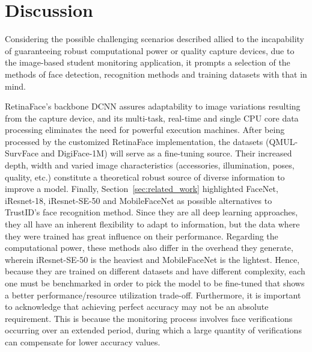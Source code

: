 \documentclass[class=report, crop=false, a4paper, 12pt]{standalone}
\begin{document}
\section{Discussion}\label{sec:methodology_discussion}
\par Considering the possible challenging scenarios described allied to the incapability of guaranteeing robust computational power or quality capture devices, due to the image-based student monitoring application, it prompts a selection of the methods of face detection, recognition methods and training datasets with that in mind. 
\par RetinaFace's backbone DCNN assures adaptability to image variations resulting from the capture device, and its multi-task, real-time and single CPU core data processing eliminates the need for powerful execution machines. After being processed by the customized RetinaFace implementation, the datasets (QMUL-SurvFace and DigiFace-1M) will serve as a fine-tuning source. Their increased depth, width and varied image characteristics (accessories, illumination, poses, quality, etc.) constitute a theoretical robust source of diverse information to improve a model. Finally, Section~\ref{sec:related_work} highlighted FaceNet, iResnet-18, iResnet-SE-50 and MobileFaceNet as possible alternatives to TrustID's face recognition method. Since they are all deep learning approaches, they all have an inherent flexibility to adapt to information, but the data where they were trained has great influence on their performance. Regarding the computational power, these methods also differ in the overhead they generate, wherein iResnet-SE-50 is the heaviest and MobileFaceNet is the lightest. Hence, because they are trained on different datasets and have different complexity, each one must be benchmarked in order to pick the model to be fine-tuned that shows a better performance/resource utilization trade-off. Furthermore, it is important to acknowledge that achieving perfect accuracy may not be an absolute requirement. This is because the monitoring process involves face verifications occurring over an extended period, during which a large quantity of verifications can compensate for lower accuracy values.
\end{document}
